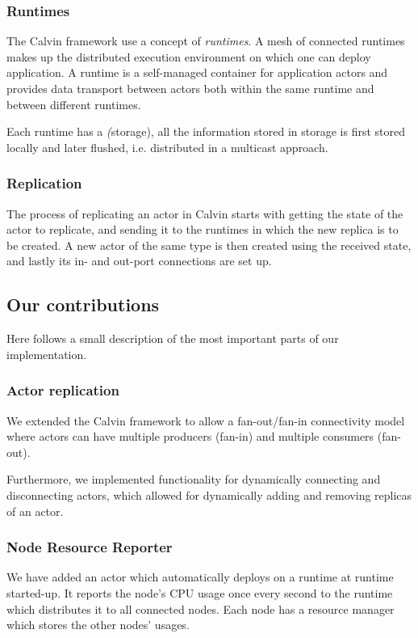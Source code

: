 \documentclass{cslthse-msc}
\begin{document}
\subsubsection{Runtimes} \label{sec:calvin_runtime}
The Calvin framework use a concept of \emph{runtimes}. A mesh of connected runtimes makes up the distributed execution environment on which one can deploy application. A runtime is a self-managed container for application actors and provides data transport between actors both within the same runtime and between different runtimes.

Each runtime has a \emph(storage), all the information stored in storage is first stored locally and later flushed, i.e. distributed in a multicast approach.

\subsubsection{Replication} \label{subsec:calvin_replication}
The process of replicating an actor in Calvin starts with getting the state of the actor to replicate, and sending it to the runtimes in which the new replica is to be created. A new actor of the same type is then created using the received state, and lastly its in- and out-port connections are set up.

\subsection{Our contributions} \label{subsec:design_contributions} %
Here follows a small description of the most important parts of our implementation.

\subsubsection{Actor replication}
We extended the Calvin framework to allow a fan-out/fan-in connectivity model where actors can have multiple producers (fan-in) and multiple consumers (fan-out). 

Furthermore, we implemented functionality for dynamically connecting and disconnecting actors, which allowed for dynamically adding and removing replicas of an actor.


\subsubsection{Node Resource Reporter}
We have added an actor which automatically deploys on a runtime at runtime started-up. It reports the node's CPU usage once every second to the runtime which distributes it to all connected nodes. Each node has a resource manager which stores the other nodes' usages.
\end{document}
